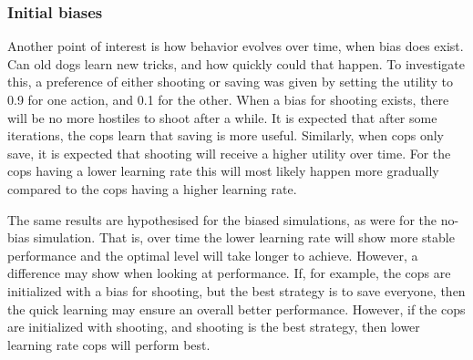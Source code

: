 \subsubsection{Initial biases}
Another point of interest is how behavior evolves over time, when bias does exist. Can old dogs learn new tricks, and how quickly could that happen. To investigate this, a preference of either shooting or saving was given by setting the utility to 0.9 for one action, and 0.1 for the other. When a bias for shooting exists, there will be no more hostiles to shoot after a while. It is expected that after some iterations, the cops learn that saving is more useful. Similarly, when cops only save, it is expected that shooting will receive a higher utility over time. For the cops having a lower learning rate this will most likely happen more gradually compared to the cops having a higher learning rate.

The same results are hypothesised for the biased simulations, as were for the no-bias simulation. That is, over time the lower learning rate will show more stable performance and the optimal level will take longer to achieve. However, a difference may show when looking at performance. If, for example, the cops are initialized with a bias for shooting, but the best strategy is to save everyone, then the quick learning may ensure an overall better performance. However, if the cops are initialized with shooting, and shooting is the best strategy, then lower learning rate cops will perform best. 
